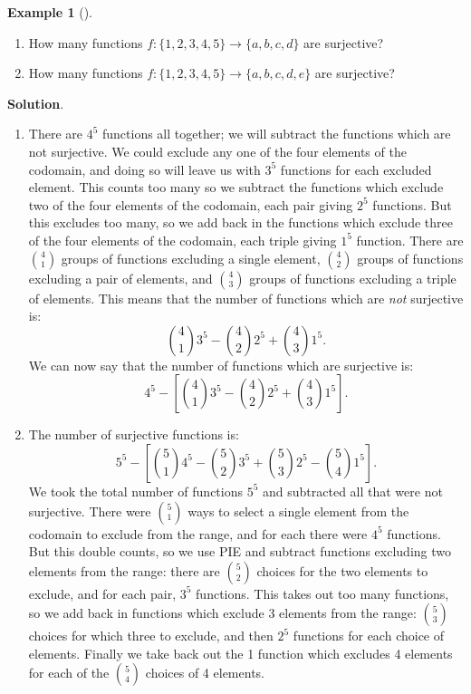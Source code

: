 \documentclass[10pt,]{book}
\theoremstyle{plain}
\theoremstyle{definition}
\theoremstyle{definition}
\newtheorem{example}[theorem]{Example}
\theoremstyle{definition}
\theoremstyle{definition}
\numberwithin{equation}{chapter}
\begin{document}
\begin{example}[]\label{example-19}
\hypertarget{p-1007}{}%
\leavevmode%
\begin{enumerate}
\item\hypertarget{li-144}{}\hypertarget{p-1008}{}%
How many functions \(f: \{1,2,3,4,5\} \to \{a,b,c,d\}\) are surjective?%
\item\hypertarget{li-145}{}\hypertarget{p-1009}{}%
How many functions \(f: \{1,2,3,4,5\} \to \{a,b,c,d,e\}\) are surjective?%
\end{enumerate}
%
\par\smallskip%
\noindent\textbf{Solution}.\hypertarget{solution-86}{}\quad%
\hypertarget{p-1010}{}%
\leavevmode%
\begin{enumerate}
\item\hypertarget{li-146}{}\hypertarget{p-1011}{}%
There are \(4^5\) functions all together; we will subtract the functions which are not surjective.  We could exclude any one of the four elements of the codomain, and doing so will leave us with \(3^5\) functions for each excluded element.  This counts too many so we subtract the functions which exclude two of the four elements of the codomain, each pair giving \(2^5\) functions.  But this excludes too many, so we add back in the functions which exclude three of the four elements of the codomain, each triple giving \(1^5\) function.  There are \({4 \choose 1}\) groups of functions excluding a single element, \({4 \choose 2}\) groups of functions excluding a pair of elements, and \({4 \choose 3}\) groups of functions excluding a triple of elements.  This means that the number of functions which are \emph{not} surjective is:%
\begin{equation*}
{4 \choose 1}3^5 - {4 \choose 2}2^5 + {4 \choose 3}1^5.
\end{equation*}
We can now say that the number of functions which are surjective is:%
\begin{equation*}
4^5 - \left[{4 \choose 1}3^5 - {4 \choose 2}2^5 + {4 \choose 3}1^5\right].
\end{equation*}
%
\item\hypertarget{li-147}{}\hypertarget{p-1012}{}%
The number of surjective functions is:%
\begin{equation*}
5^5 - \left[{5 \choose 1}4^5 - {5 \choose 2}3^5 + {5 \choose 3}2^5 - {5 \choose 4}1^5\right].
\end{equation*}
We took the total number of functions \(5^5\) and subtracted all that were not surjective.  There were \({5 \choose 1}\) ways to select a single element from the codomain to exclude from the range, and for each there were \(4^5\) functions.  But this double counts, so we use PIE and subtract functions excluding two elements from the range: there are \({5 \choose 2}\) choices for the two elements to exclude, and for each pair, \(3^5\) functions.  This takes out too many functions, so we add back in functions which exclude 3 elements from the range: \({5 \choose 3}\) choices for which three to exclude, and then \(2^5\) functions for each choice of elements.  Finally we take back out the 1 function which excludes 4 elements for each of the \({5 \choose 4}\) choices of 4 elements.%

\end{enumerate}
\end{example}
\end{document}
